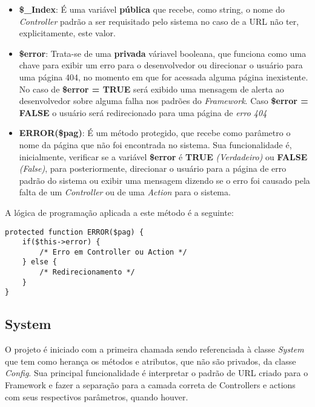         \begin{itemize}
            \item\textbf{\$\_Index}: É uma variável \textbf{pública} que recebe, como string, o nome do \emph{Controller} padrão a ser requisitado pelo sistema no caso de a URL não ter, explicitamente, este valor.

            \item\textbf{\$error}: Trata-se de uma \textbf{privada} váriavel booleana, que funciona como uma chave para exibir um erro para o desenvolvedor ou direcionar o usuário para uma página 404, no momento em que for acessada alguma página inexistente. No caso de \textbf{\$error = TRUE} será exibido uma mensagem de alerta ao desenvolvedor sobre alguma falha nos padrões do \emph{Framework}. Caso \textbf{\$error = FALSE} o usuário será redirecionado para uma página de \emph{erro 404}

            \item\textbf{ERROR(\$pag)}: É um método protegido, que recebe como parâmetro o nome da página que não foi encontrada no sistema. Sua funcionalidade é, inicialmente, verificar se a variável \textbf{\$error} é \textbf{TRUE} \emph{(Verdadeiro)} ou \textbf{FALSE} \emph{(False)}, para posteriormente, direcionar o usuário para a página de erro padrão do sistema ou exibir uma mensagem dizendo se o erro foi causado pela falta de um \emph{Controller} ou de uma \emph{Action} para o sistema.
        \end{itemize}

        \emph{}

        \emph{}

        A lógica de programação aplicada a este método é a seguinte:

        \emph{}

\begin{lstlisting}
protected function ERROR($pag) {
    if($this->error) {
        /* Erro em Controller ou Action */
    } else {
        /* Redirecionamento */
    }
}
\end{lstlisting}


        \subsection{System\label{sub:system-sis}}

            O projeto é iniciado com a primeira chamada sendo referenciada à classe \emph{System} que tem como herança os métodos e atributos, que não são privados, da classe \emph{Config}. Sua principal funcionalidade é interpretar o padrão de URL criado para o Framework e fazer a separação para a camada correta de Controllers e actions com seus respectivos parâmetros, quando houver.

